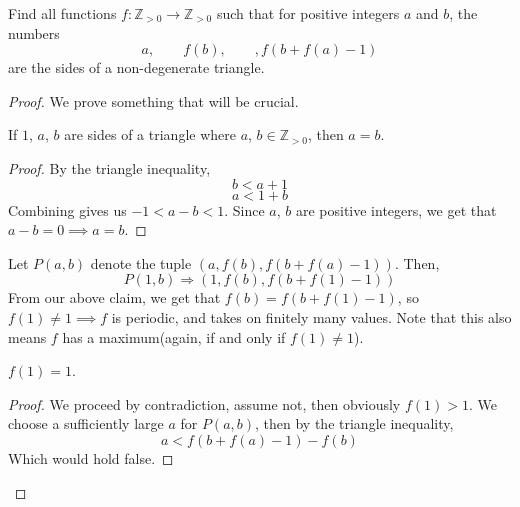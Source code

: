 \documentclass[11pt]{scrartcl}
\begin{document}
\begin{problem}
  [IMO 2009]
  Find all functions $f: \mathbb{Z}_{>0} \rightarrow \mathbb{Z}_{>0}$ such that for positive integers $a$ and $b$, the numbers
  \[
  a, \qquad f(b), \qquad, f(b+f(a)-1)
  \]
  are the sides of a non-degenerate triangle.
\end{problem}

\begin{proof}
  We prove something that will be crucial.
  \begin{claim}
    If $1$, $a$, $b$ are sides of a triangle where $a$, $b \in \mathbb{Z}_{>0}$, then $a=b$.
    \begin{proof}
      By the triangle inequality,
      \[
      b < a + 1
      \]
      \[
      a < 1 + b
      \]
      Combining gives us $-1 < a-b < 1$. Since $a$, $b$ are positive integers, we get that $a-b=0 \implies a=b$.
    \end{proof}
  \end{claim}
  Let $P(a, b)$ denote the tuple $(a, f(b), f(b+f(a)-1))$. Then,
  \[
  P(1, b) \Longrightarrow (1, f(b), f(b+f(1)-1))
  \]
  From our above claim, we get that $f(b) = f(b+f(1)-1)$, so $f(1) \neq 1 \implies $$f$ is periodic, and takes on finitely many values. 
  Note that this also means $f$ has a maximum(again, if and only if $f(1) \neq 1$).
  \begin{claim}
    $f(1) = 1$.
    \begin{proof}
      We proceed by contradiction, assume not, then obviously $f(1) > 1$. We choose a sufficiently large $a$ for
      $P(a, b)$, then by the triangle inequality,
      \[
      a < f(b+f(a)-1) - f(b)
      \]
      Which would hold false.
    \end{proof}
  \end{claim}
\end{proof}
\end{document}
